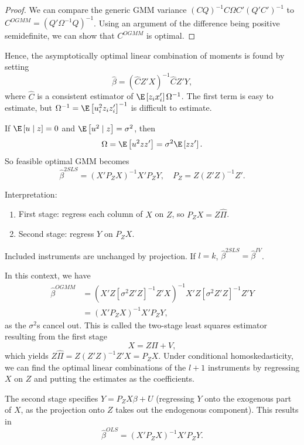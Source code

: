\begin{proof}
	We can compare the generic GMM variance $\left( CQ\right)^{-1}C\Omega C' \left( Q'C' \right)^{-1}$ to $C^{OGMM} = \left( Q'\Omega^{-1}Q \right)^{-1}$. Using an argument of the difference being positive semidefinite, we can show that $C^{OGMM}$ is optimal.
\end{proof}

Hence, the asymptotically optimal linear combination of moments is found by setting \[
	\hat{\beta} = \left( \hat{C} Z' X \right)^{-1} \hat{C} Z' Y
,\] where $\hat{C}$ is a consistent estimator of $\E\left[z_i x_i'\right] \Omega^{-1}$. The first term is easy to estimate, but $\Omega^{-1} = \E\left[u_i^2 z_i z_i'\right] ^{-1}$ is difficult to estimate.

\begin{proposition}
	If $\E\left[u\mid z\right]=0$ and $\E\left[u^2\mid z\right]=\sigma^2$, then \[
		\Omega = \E\left[u^2 zz'\right] = \sigma^2\E\left[zz'\right]
	.\]
	So feasible optimal GMM becomes \[
		\hat{\beta}^{2SLS} = (X'P_ZX)^{-1}X'P_ZY, \quad P_Z = Z(Z'Z)^{-1}Z'
	.\]

	Interpretation:
	\begin{enumerate}[label=(\roman*)]
		\item First stage: regress each column of $X$ on $Z$, so $P_ZX=Z\hat{\Pi}$.
		\item Second stage: regress $Y$ on $P_ZX$.
	\end{enumerate}
	Included instruments are unchanged by projection. If $l=k$, $\hat{\beta}^{2SLS}=\hat{\beta}^{IV}$.
\end{proposition}

In this context, we have
\begin{align*}
	\hat{\beta}^{OGMM}
	&= \left( X'Z \left[ \sigma^2 Z'Z \right]^{-1} Z'X \right)^{-1} X'Z \left[ \sigma^2Z'Z \right]^{-1} Z' Y \\
	&= \left( X'P_Z X \right)^{-1} X'P_ZY
,\end{align*}
as the $\sigma^2$s cancel out.
This is called the two-stage least squares estimator resulting from the first stage \[
	X = Z \Pi +  V
,\] which yields $Z\hat{\Pi} = Z\left( Z'Z \right)^{-1}Z' X = P_Z X$. Under conditional homoskedasticity, we can find the optimal linear combinations of the $l+1$ instruments by regressing $X$ on $Z$ and putting the estimates as the coefficients. 

The second stage specifies $Y = P_Z X \beta + U$ (regressing $Y$ onto the exogenous part of $X$, as the projection onto $Z$ takes out the endogenous component). This results in \[
	\hat{\beta}^{OLS} = \left( X' P_Z X \right)^{-1} X'P_Z Y
.\] 

